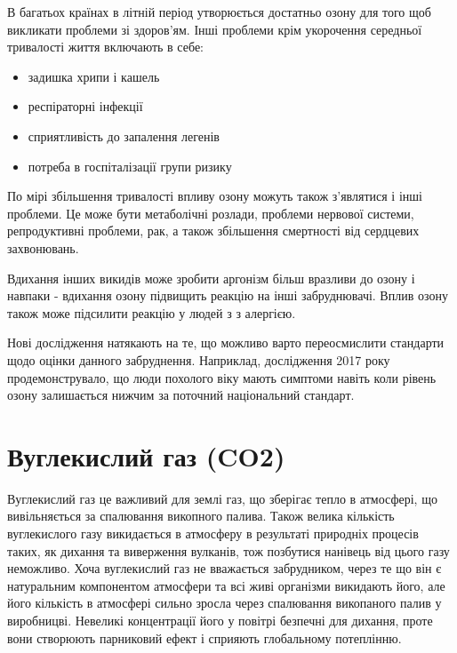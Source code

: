 В багатьох країнах в літній період утворюється достатньо озону для того щоб викликати проблеми 
зі здоров'ям. Інші проблеми крім укорочення середньої тривалості життя включають в себе: 

\begin{itemize}
    \item задишка хрипи і кашель
    \item респіраторні інфекції
    \item сприятливість до запалення легенів
    \item потреба в госпіталізації групи ризику
\end{itemize}

По мірі збільшення тривалості впливу озону можуть також з'являтися і інші проблеми. Це може бути 
метаболічні розлади, проблеми нервової системи, репродуктивні проблеми, рак, а також збільшення 
смертності від сердцевих захвонювань. 

Вдихання інших викидів може зробити аргонізм більш вразливи до озону і навпаки - вдихання озону 
підвищить реакцію на інші забруднювачі. Вплив озону також може підсилити реакцію у людей з 
з алергією.\cite{us_epa_ground-level_2015}

Нові дослідження натякають на те, що можливо варто переосмислити стандарти щодо оцінки данного
забруднення. Наприклад, дослідження 2017 року продемонструвало, що люди похолого віку мають 
симптоми навіть коли рівень озону залишається нижчим за поточний національний стандарт.


\section{Вуглекислий газ (CO2)}

Вуглекислий газ це важливий для землі газ, що зберігає тепло в атмосфері, що вивільняється за спалювання викопного палива. 
Також велика кількість вуглекислого газу викидається в атмосферу в результаті природніх процесів таких, як дихання та виверження вулканів, тож позбутися нанівець від цього газу неможливо. 
Хоча вуглекислий газ не вважається забрудником, через те що він є натуральним компонентом атмосфери та всі живі організми викидають його, але його кількість в атмосфері сильно зросла через спалювання викопаного палив у виробницві. 
Невеликі концентрації його у повітрі безпечні для дихання, проте вони створюють парниковий ефект і сприяють глобальному потеплінню.

